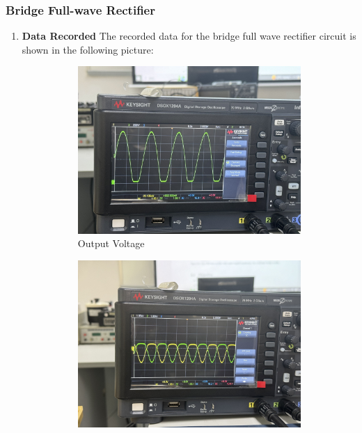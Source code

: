     \subsubsection{Bridge Full-wave Rectifier}
    \begin{enumerate}[I]
        \item \textbf{Data Recorded}\newline
            The recorded data for the bridge full wave rectifier circuit is shown in the following picture:
            \begin{figure}[h]
                \centering
                \begin{subfigure}[h]{0.4\textwidth}
                    \centering
                    \includegraphics[width=1\textwidth]{Experiment_03/Images/3.5_outPutVoltage.jpg}
                    \caption{Output Voltage}
                    \label{wave:3.5OV}
                \end{subfigure}
                \begin{subfigure}[h]{0.4\textwidth}
                    \centering
                    \includegraphics[width=1\textwidth]{Experiment_03/Images/3.5_diodeVoltage.jpg}

\end{subfigure}
\end{figure}
\end{enumerate}
